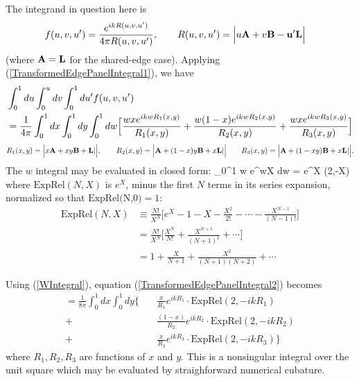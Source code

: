 \documentclass[letterpaper]{article}
\begin{document}
The integrand in question here is 
\begin{align*}
 f(u,v,u^\prime)
&=\frac{e^{ikR(u,v,u^\prime)}}{4\pi R(u,v,u^\prime)},
\qquad 
 R(u,v,u^\prime)=\Big|u\mathbf{A} + v\mathbf{B} - \mathbf{u}^\prime \mathbf{L}\Big|
\end{align*}
(where $\mathbf{A}=\mathbf{L}$ for the shared-edge case).
Applying (\ref{TransformedEdgePanelIntegral1}), we have
\begin{align}
&\int_0^1 du \int_0^u dv \int_0^1 du^\prime f(u,v,u^\prime)
\nonumber \\
&=\frac{1}{4\pi}\int_0^1 dx \int_0^1 dy \int_0^1 dw
\Big[  \frac{ w x     e^{ikwR_1(x,y)}}{R_1(x,y)} 
     + \frac{ w (1-x) e^{ikwR_2(x,y)}}{R_2(x,y)} 
     + \frac{ w x     e^{ikwR_3(x,y)}}{R_3(x,y)}
\Big] 
\label{TransformedEdgePanelIntegral2}
\end{align}
$$ R_1(x,y)=\Big| x\mathbf{A} + xy \mathbf{B} + \mathbf{L}|\Big|,
   \qquad
   R_2(x,y)=\Big| \mathbf{A} + (1-x)y \mathbf{B} + x\mathbf{L}|\Big|
   \qquad
   R_3(x,y)=\Big| \mathbf{A} + (1-xy) \mathbf{B} + x\mathbf{L}|\Big|.
$$
The $w$ integral may be evaluated in closed form:
{\int_0^1 w e^{wX} dw  = e^X \cdot {}(2,-X)}
where $\text{ExpRel}(N,X)$ is 
$e^X$, minus the first $N$ terms in its series expansion,
normalized so that $\text{ExpRel(N,0)}=1$:
\begin{align*}
 \text{ExpRel}(N,X) &\equiv
   \frac{N!}{X^N}\Big[e^{X} - 1 - X - \frac{X^2}{2!} - \cdots 
                             - \frac{X^{N-1}}{(N-1)!} \Big]
\\
&=
   \frac{N!}{X^N}\Big[\frac{X^N}{N!} + \frac{X^{N+1}}{(N+1)^1} + \cdots\Big] 
\\
&=
   1 + \frac{X}{N+1} + \frac{X^2}{(N+1)(N+2)} + \cdots
\end{align*}

Using (\ref{WIntegral}), equation (\ref{TransformedEdgePanelIntegral2})
becomes 
\begin{align*}
=\frac{1}{8\pi}\int_0^1 dx \int_0^1 dy \bigg\{
 \quad &\frac{x}{R_1} e^{ikR_1} \cdot \text{ExpRel}(2,-ikR_1)
\\
      +&\frac{(1-x)}{R_2} e^{ikR_2} \cdot \text{ExpRel}(2,-ikR_2)
\\
      +&\frac{x}{R_3}e^{ikR_3} \cdot \text{ExpRel}(2,-ikR_3)
  \bigg\}
\end{align*}
where $R_1, R_2, R_3$ are functions of $x$ and $y$. This is a nonsingular
integral over the unit square which may be evaluated by straighforward
numerical cubature.
\end{document}
